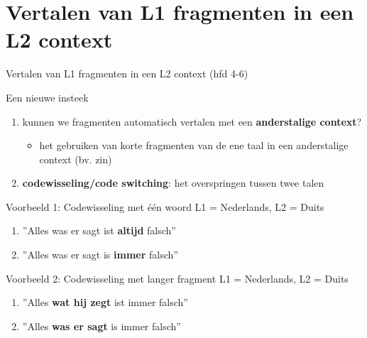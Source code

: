 \documentclass[8pt]{beamer}
\begin{document}
\section{Vertalen van L1 fragmenten in een L2 context}

\begin{frame}{Vertalen van L1 fragmenten in een L2 context (hfd 4-6)}
    \begin{block}{Een nieuwe insteek}
        \begin{enumerate}
            \item kunnen we fragmenten automatisch vertalen met een \textbf{anderstalige context}?
            \begin{itemize}
            \item het gebruiken van korte fragmenten van de ene taal in een anderstalige context (bv. zin)
            \end{itemize}
            \item \textbf{codewisseling/code switching}: het overspringen tussen twee talen
        \end{enumerate}
    \end{block}

    \begin{block}{Voorbeeld 1: Codewisseling met één woord}
        L1 = Nederlands, L2 = Duits
        \begin{enumerate}
            \item ''Alles was er sagt ist \textbf{altijd} falsch''
            \item ''Alles was er sagt is \textbf{immer} falsch''
        \end{enumerate}
    \end{block}

    \begin{block}{Voorbeeld 2: Codewisseling met langer fragment}
        L1 = Nederlands, L2 = Duits
        \begin{enumerate}
            \item ''Alles \textbf{wat hij zegt} ist immer falsch''
            \item ''Alles \textbf{was er sagt} is immer falsch''
        \end{enumerate}
    \end{block}
\end{frame}
\end{document}
